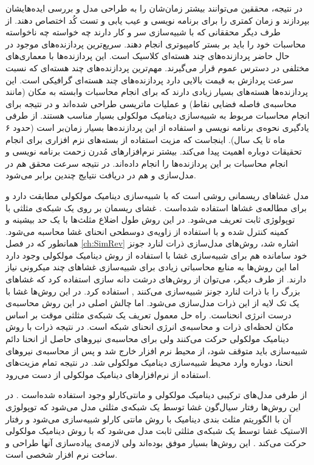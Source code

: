 در نتیجه، محققین می‌توانند بیشتر زمان‌شان را به طراحی مدل و بررسی ایده‌هایشان بپردازند و زمان کمتری را برای برنامه نویسی و عیب یابی  و تست کُد اختصاص دهند. از طرف دیگر محققانی که با شبیه‌سازی سر و کار دارند چه خواسته چه ناخواسته محاسبات خود را باید بر بستر کامپیوتر‌ی انجام دهند. سریع‌ترین  پردازنده‌های موجود در حال حاضر پردازنده‌های چند هسته‌ای
 کلاسیک است. این پردازنده‌ها با معماری‌های مختلفی در دسترس عموم قرار می‌گیرند. مهم‌ترین پردازند‌ه‌های چند هسته‌ای که  نسبت سرعت پردازش به  قیمت بالایی دارد پردازنده‌های چند هسته‌ای گرافیکی
است. این پردازنده‌‌ها هسته‌های بسیار زیادی دارند که برای انجام محاسبات وابسته به مکان (مانند محاسبه‌ی فاصله‌ فضایی نقاط) 
و عملیات ماتریسی طراحی شده‌اند و در نتیجه برای انجام محاسبات مربوط به شبیه‌سازی دینامیک مولکولی بسیار مناسب هستند.  از طرفی یادگیری نحوه‌ی برنامه نویسی و استفاده از این پردازنده‌ها بسیار زمان‌بر است (حدود ۶ ماه تا یک سال). اینجاست که مزیت استفاده از بسته‌های نزم افزاری برای انجام تحقیقات دوباره اهمیت پیدا می‌کند. بیشتر نرم‌افزار‌های مُدرن زحمت برنامه نویسی و انجام محاسبات بر این پردازنده‌ها را انجام داده‌اند. در نتیجه سرعت محقق هم در مدل‌سازی و هم در دریافت نتیایج چندین برابر می‌شود.

مدل غشا‌های ریسمانی روشی است که با شبیه‌سازی دینامیک مولکولی مطابقت دارد و برای مطالعه‌ی غشا‌ها استفاده شده‌است
\cite{Abraham1989PRL}.
 غشای ریسمان بر روی یک شبکه‌ی مثلثی با توپولوژی ثابت تعریف می‌شود. در این روش طول اضلاع مثلث‌ها با یک حد بیشینه و کمینه کنترل شده و با استفاده از زاویه‌ی دوسطحی
انحنای غشا محاسبه می‌شود. همانطور که در فصل
\ref{ch:SimRev}
 اشاره شد، روش‌های مدل‌سازی ذرات لنارد جونز خود سامانده هم برای شبیه‌سازی غشا با استفاده از روش دینامیک مولکولی وجود دارد 
 \cite{Discher2004NatMat, Schindler2016BBA}
 اما این روش‌ها به منابع محاسباتی زیادی برای شبیه‌‌سازی غشا‌های چند میکرونی نیاز دارند. از طرف دیگر، می‌توان از روش‌های درشت دانه سازی استفاده کرد که غشا‌های بزرگ را با ذرات لنارد جونز شبیه‌سازی می‌کنند
 \cite{Li2005},
 استفاده‌ کرد. در این روش‌ها غشا با یک تک لایه از این ذرات مدل‌سازی می‌شود. اما چالش اصلی در این روش محاسبه‌ی درست انرژی انحناست. راه حل معمول تعریف یک شبکه‌ی مثلثی موقت بر اساس مکان لحظه‌ای ذرات و محاسبه‌ی انرژی انحنای شبکه است. در نتیجه ذرات با روش دینامیک مولکولی حرکت می‌کنند ولی برای محاسبه‌ی نیروهای حاصل از انحنا دائم شبیه‌سازی باید متوقف شود، از محیط نرم افزار خارج شد و پس از محاسبه‌ی نیرو‌های انحنا، دوباره وارد محیط شبیه‌سازی دینامیک مولکولی شد. در نتیجه تمام مزیت‌های استفاده از نرم‌افزار‌های دینامیک مولکولی از دست می‌رود.
 
 از طرفی مدل‌های ترکیبی دینامیک مولکولی و مانتی‌کارلو  وجود استفاده شده‌است
  \cite{Gompper2005PRE, Noguchi2005PNAS}.
  در این روش‌ها رفتار سیال‌گون غشا توسط یک شبکه‌ی مثلثی مدل‌ می‌شود که توپولوژی آن با الگوریتم مثلث بندی دینامیک با روش مانتی کارلو شبیه‌سازی می‌شود و رفتار الاستیک غشا توسط یک شبکه‌ی مثلثی ثابت مدل می‌شود که با روش دینامیک مولکولی حرکت می‌کند
 \cite{Gompper2005PRE, Noguchi2005PNAS}.
 این روش‌ها بسیار موفق بوده‌اند ولی لازمه‌ی پیاده‌سازی آنها طراحی و ساخت نرم افزار شخصی است.
  














